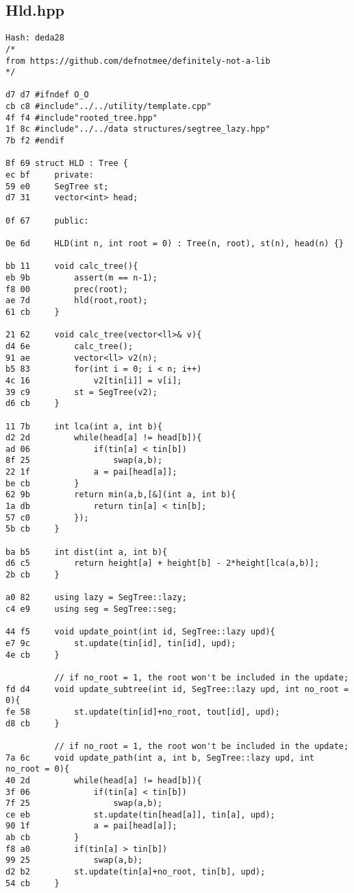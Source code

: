 \documentclass[11pt, a4paper, twoside]{article}
\begin{document}
\subsection{Hld.hpp}
\begin{lstlisting}
Hash: deda28
/*
from https://github.com/defnotmee/definitely-not-a-lib
*/

d7 d7 #ifndef O_O
cb c8 #include"../../utility/template.cpp"
4f f4 #include"rooted_tree.hpp"
1f 8c #include"../../data structures/segtree_lazy.hpp"
7b f2 #endif

8f 69 struct HLD : Tree {
ec bf     private:
59 e0     SegTree st;
d7 31     vector<int> head;
      
0f 67     public:
      
0e 6d     HLD(int n, int root = 0) : Tree(n, root), st(n), head(n) {}
      
bb 11     void calc_tree(){
eb 9b         assert(m == n-1);
f8 00         prec(root);
ae 7d         hld(root,root);
61 cb     }
      
21 62     void calc_tree(vector<ll>& v){
d4 6e         calc_tree();
91 ae         vector<ll> v2(n);
b5 83         for(int i = 0; i < n; i++)
4c 16             v2[tin[i]] = v[i];
39 c9         st = SegTree(v2);
d6 cb     }
      
11 7b     int lca(int a, int b){
d2 2d         while(head[a] != head[b]){
ad 06             if(tin[a] < tin[b])
8f 25                 swap(a,b);
22 1f             a = pai[head[a]];
be cb         }
62 9b         return min(a,b,[&](int a, int b){
1a db             return tin[a] < tin[b];
57 c0         });
5b cb     }
      
ba b5     int dist(int a, int b){
d6 c5         return height[a] + height[b] - 2*height[lca(a,b)];
2b cb     }
      
a0 82     using lazy = SegTree::lazy;
c4 e9     using seg = SegTree::seg;
      
44 f5     void update_point(int id, SegTree::lazy upd){
e7 9c         st.update(tin[id], tin[id], upd);
4e cb     }
      
          // if no_root = 1, the root won't be included in the update;
fd d4     void update_subtree(int id, SegTree::lazy upd, int no_root = 0){
fe 58         st.update(tin[id]+no_root, tout[id], upd);
d8 cb     }
      
          // if no_root = 1, the root won't be included in the update;
7a 6c     void update_path(int a, int b, SegTree::lazy upd, int no_root = 0){
40 2d         while(head[a] != head[b]){
3f 06             if(tin[a] < tin[b])
7f 25                 swap(a,b);
ce eb             st.update(tin[head[a]], tin[a], upd);
90 1f             a = pai[head[a]];
ab cb         }
f8 a0         if(tin[a] > tin[b])
99 25             swap(a,b);
d2 b2         st.update(tin[a]+no_root, tin[b], upd);
54 cb     }
      

\end{lstlisting}
\end{document}
